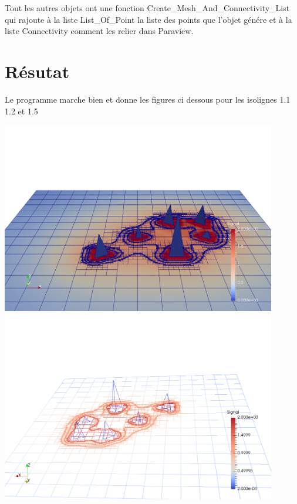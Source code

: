 \documentclass[french]{article}
\begin{document}
Tout les autres objets ont une fonction Create\_Mesh\_And\_Connectivity\_List qui rajoute à la liste List\_Of\_Point la liste des points
que l'objet génére et à la liste Connectivity comment les relier dans Paraview.

\section{Résutat}
Le programme marche bien et donne les figures ci dessous pour les isolignes 1.1 1.2 et 1.5

\begin{center}
	\includegraphics[width=0.9\textwidth]{Figures/Finalwhite2.png}
	\includegraphics[width=0.9\textwidth]{Figures/Finalwhite.png}
\end{center}
\end{document}
